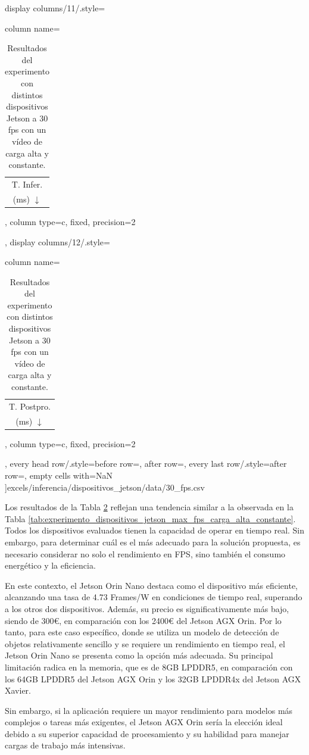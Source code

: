 \documentclass[11pt,spanish,listoffigures,listoftables]{tfgetsinf}
\begin{document}
\begin{table}[H]
{      display columns/11/.style={column name=\begin{tabular}[c]{@{}c@{}}T. Infer.\\(ms) $\downarrow$\end{tabular}, column type={c}, fixed, precision=2},
      display columns/12/.style={column name=\begin{tabular}[c]{@{}c@{}}T. Postpro.\\(ms) $\downarrow$\end{tabular}, column type={c}, fixed, precision=2},
      every head row/.style={before row=\toprule, after row=\midrule},
      every last row/.style={after row=\bottomrule},
      empty cells with={NaN}
      ]{excels/inferencia/dispositivos_jetson/data/30_fps.csv}
      }
      \caption[Resultados del experimento con distintos dispositivos Jetson a 30 fps con un vídeo de carga alta y constante]{Resultados del experimento con distintos dispositivos Jetson a 30 fps con un vídeo de carga alta y constante.}
      \label{tab:experimento_dispositivos_jetson_30_fps_carga_alta_constante}
\end{table}

Los resultados de la Tabla \ref{tab:experimento_dispositivos_jetson_30_fps_carga_alta_constante} reflejan una tendencia similar a la observada en la Tabla \ref{tab:experimento_dispositivos_jetson_max_fps_carga_alta_constante}. Todos los dispositivos evaluados tienen la capacidad de operar en tiempo real. Sin embargo, para determinar cuál es el más adecuado para la solución propuesta, es necesario considerar no solo el rendimiento en FPS, sino también el consumo energético y la eficiencia.

En este contexto, el Jetson Orin Nano destaca como el dispositivo más eficiente, alcanzando una tasa de 4.73 Frames/W en condiciones de tiempo real, superando a los otros dos dispositivos. Además, su precio es significativamente más bajo, siendo de 300€, en comparación con los 2400€ del Jetson AGX Orin. Por lo tanto, para este caso específico, donde se utiliza un modelo de detección de objetos relativamente sencillo y se requiere un rendimiento en tiempo real, el Jetson Orin Nano se presenta como la opción más adecuada. Su principal limitación radica en la memoria, que es de 8GB LPDDR5, en comparación con los 64GB LPDDR5 del Jetson AGX Orin y los 32GB LPDDR4x del Jetson AGX Xavier.

Sin embargo, si la aplicación requiere un mayor rendimiento para modelos más complejos o tareas más exigentes, el Jetson AGX Orin sería la elección ideal debido a su superior capacidad de procesamiento y su habilidad para manejar cargas de trabajo más intensivas.
\end{document}
